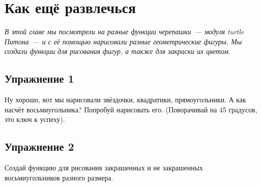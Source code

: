 \section{Как ещё развлечься}

\emph{В этой главе мы посмотрели на разные функции черепашки — модуля turtle Питона — и с её помощью нарисовали разные геометрические фигуры. Мы создали функции для рисования фигур, а также для закраски их цветом.}

\subsection*{Упражнение 1}
Ну хорошо, вот мы нарисовали звёздочки, квадратики, прямоугольники. А как насчёт восьмиугольника? Попробуй нарисовать его. (Поворачивай на 45 градусов, это ключ к успеху).

\subsection*{Упражнение 2}
Создай функцию для рисования закрашенных и не закрашенных восьмиугольников разного размера.

\newpage
